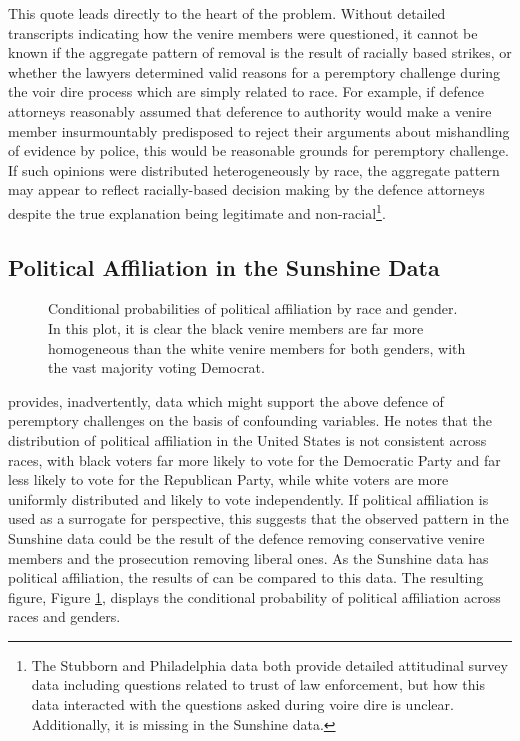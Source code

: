 This quote leads directly to the heart of the problem. Without detailed transcripts indicating how the venire members were
questioned, it cannot be known if the aggregate pattern of removal is the result of racially based strikes, or whether the lawyers
determined valid reasons for a peremptory challenge during the voir dire process which are simply related to race. For example, if
defence attorneys reasonably assumed that deference to authority would make a venire member insurmountably predisposed to reject
their arguments about mishandling of evidence by police, this would be reasonable grounds for
peremptory challenge. If such opinions were distributed heterogeneously by race, the aggregate pattern may appear to reflect
racially-based decision making by the defence attorneys despite the
true explanation being legitimate and non-racial\footnote{The Stubborn and Philadelphia data
  both provide detailed attitudinal survey data including questions related to trust of law enforcement, but how this data
  interacted with the questions asked during voire dire is unclear. Additionally, it is missing in the Sunshine data.}.

\subsection{Political Affiliation in the Sunshine Data} \label{sec:polaff}

\begin{figure}[h!]
  \centering
  \caption[Political Affiliation by Race and Gender (Sunshine)]
  {\footnotesize Conditional probabilities of political affiliation by race and gender. In this plot, it is clear the black venire
    members are far more homogeneous than the white venire members for both genders, with the vast majority voting Democrat.} 
  \label{fig:racepolit}
\end{figure}

\cite{revesz2016} provides, inadvertently, data which might support the above defence of peremptory challenges on the basis of
confounding variables. He notes that the distribution of political affiliation in the United States is not
consistent across races, with black voters far more likely to vote for the Democratic Party and far less likely to vote for the
Republican Party, while white voters are more uniformly distributed and likely to vote independently. If political affiliation is
used as a surrogate for perspective, this suggests that the observed pattern in the Sunshine data could be the result of the
defence removing conservative venire members and the prosecution removing liberal ones. As the Sunshine data has political
affiliation, the results of \citeauthor{revesz2016} can be compared to this data. The resulting figure, Figure
\ref{fig:racepolit}, displays the conditional probability of political affiliation across races and genders.

